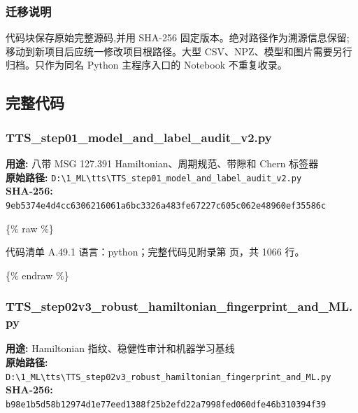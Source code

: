 \documentclass[lang=cn,scheme=chinese,color=blue,device=normal,toc=onecol,math=cm]{elegantbook}
\begin{document}
\subsubsection{迁移说明}


代码块保存原始完整源码,并用 SHA-256 固定版本。绝对路径作为溯源信息保留;移动到新项目后应统一修改项目根路径。大型 CSV、NPZ、模型和图片需要另行归档。只作为同名 Python 主程序入口的 Notebook 不重复收录。\par


\subsection{完整代码}


\subsubsection{TTS\_\allowbreak{}step01\_\allowbreak{}model\_\allowbreak{}and\_\allowbreak{}label\_\allowbreak{}audit\_\allowbreak{}v2.py}


\textbf{用途:} 八带 MSG 127.391 Hamiltonian、周期规范、带隙和 Chern 标签器\\ \textbf{原始路径:} \texttt{D:\textbackslash{}\allowbreak{}1\_\allowbreak{}ML\textbackslash{}\allowbreak{}tts\textbackslash{}\allowbreak{}TTS\_\allowbreak{}step01\_\allowbreak{}model\_\allowbreak{}and\_\allowbreak{}label\_\allowbreak{}audit\_\allowbreak{}v2.py}\\ \textbf{SHA-256:} \texttt{9eb5374e4d4cc6306216061a6bc3326a483fe67227c605c062e48960ef35586c}\par


\{\% raw \%\}\par


\begin{codeindexbox}{代码清单 A.49.1}
语言：python；完整代码见附录第 \pageref{code:49:1} 页，共 1066 行。
\end{codeindexbox}


\{\% endraw \%\}\par


\subsubsection{TTS\_\allowbreak{}step02v3\_\allowbreak{}robust\_\allowbreak{}hamiltonian\_\allowbreak{}fingerprint\_\allowbreak{}and\_\allowbreak{}ML.py}


\textbf{用途:} Hamiltonian 指纹、稳健性审计和机器学习基线\\ \textbf{原始路径:} \texttt{D:\textbackslash{}\allowbreak{}1\_\allowbreak{}ML\textbackslash{}\allowbreak{}tts\textbackslash{}\allowbreak{}TTS\_\allowbreak{}step02v3\_\allowbreak{}robust\_\allowbreak{}hamiltonian\_\allowbreak{}fingerprint\_\allowbreak{}and\_\allowbreak{}ML.py}\\ \textbf{SHA-256:} \texttt{b98e1b5d58b12974d1e77eed1388f25b2efd22a7998fed060dfe46b310394f39}\par
\end{document}
